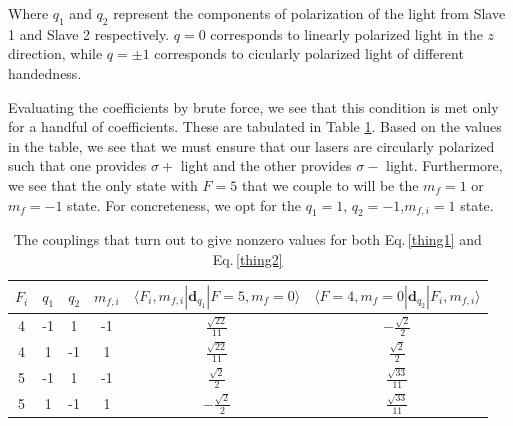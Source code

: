 Where $q_1$ and $q_2$ represent the components of polarization of the light from Slave 1 and Slave 2 respectively. $q=0$ corresponds to linearly polarized light in the $z$ direction, while $q=\pm 1$ corresponds to cicularly polarized light of different handedness.

Evaluating the coefficients by brute force, we see that this condition is met only for a handful of coefficients. These are tabulated in Table \ref{nonzeroCG}. Based on the values in the table, we see that we must ensure that our lasers are circularly polarized such that one provides $\sigma+$ light and the other provides $\sigma-$ light. Furthermore, we see that the only state with $F=5$ that we couple to will be the $m_f=1$ or $m_f=-1$ state. For concreteness, we opt for the $q_1=1$, $q_2=-1$,$m_{f,i}=1$ state. 

\begin{table}[h!]
\centering
\begin{tabular}{|c|c|c|c|c|c|}
$F_i$ & $q_1$ & $q_2$ & $m_{f,i}$ &$\langle  F_i,m_{f,i}|\mathbf{d}_{q_1}|F=5,m_f=0\rangle$&$\langle F=4,m_f=0|\mathbf{d}_{q_2}|F_i,m_{f,i}\rangle$ \\ 
\hline
4 & -1 & 1 & -1 &$ \frac{\sqrt{22}}{11} $&$ - \frac{\sqrt{2}}{2} $ \\ 
4 & 1 & -1 & 1 &$ \frac{\sqrt{22}}{11} $&$ \frac{\sqrt{2}}{2} $ \\ 
5 & -1 & 1 & -1 &$ \frac{\sqrt{2}}{2} $&$ \frac{\sqrt{33}}{11} $ \\ 
5 & 1 & -1 & 1 &$ - \frac{\sqrt{2}}{2} $&$ \frac{\sqrt{33}}{11} $ \\
\end{tabular}
\caption{The couplings that turn out to give nonzero values for both Eq.\,\ref{thing1} and Eq.\,\ref{thing2}}
\label{nonzeroCG}
\end{table}


%
%


%
%
%


